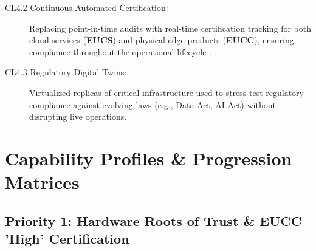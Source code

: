 \documentclass{ieeeaccess}
\begin{document}
\begin{description}
\item[CL4.2 Continuous Automated Certification:] Replacing point-in-time audits with real-time certification tracking for both cloud services (\textbf{EUCS}) and physical edge products (\textbf{EUCC}), ensuring compliance throughout the operational lifecycle \cite{eucc}.

\item[CL4.3 Regulatory Digital Twins:] Virtualized replicas of critical infrastructure used to stress-test regulatory compliance against evolving laws (e.g., Data Act, AI Act) without disrupting live operations.

\end{description}

\newpage
\section{Capability Profiles \& Progression Matrices}

\subsection*{Priority 1: Hardware Roots of Trust \& EUCC 'High' Certification}
\end{document}
